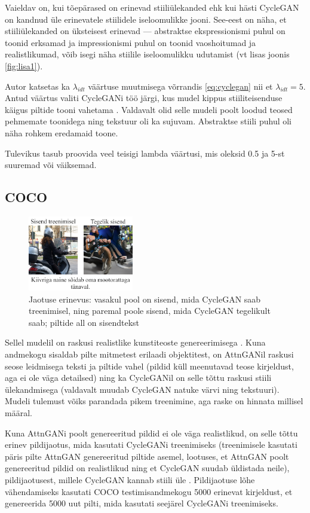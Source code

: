 \documentclass{vilgym}
\begin{document}
	Vaieldav on, kui tõepärased on erinevad stiiliülekanded ehk kui hästi CycleGAN on kandnud üle erinevatele stiilidele iseloomulikke jooni. See-eest on näha, et stiiliülekanded on üksteisest erinevad --- abstraktse ekspressionismi puhul on toonid erksamad ja impressionismi puhul on toonid vaoshoitumad ja realistlikumad, võib isegi näha stiilile iseloomulikku udutamist (vt lisas joonis \ref{fig:lisa1}).

	Autor katsetas ka $ \lambda_{idt} $ väärtuse muutmisega võrrandis \ref{eq:cyclegan} nii et $ \lambda_{idt} = 5 $. Antud väärtus valiti CycleGANi töö järgi, kus mudel kippus stiiliteisenduse käigus piltide tooni vahetama \parencite{cyclegan}. Valdavalt olid selle mudeli poolt loodud teosed pehmemate toonidega ning tekstuur oli ka sujuvam. Abstraktse stiili puhul oli näha rohkem eredamaid toone.

	Tulevikus tasub proovida veel teisigi lambda väärtusi, mis oleksid 0.5 ja 5-st suuremad või väiksemad. 

	\subsection{COCO}

	\begin{figure}
		\includegraphics[width=0.41\textwidth]{images/distribution.png}
		\caption{Jaotuse erinevus: vasakul pool on sisend, mida CycleGAN saab treenimisel, ning paremal poole sisend, mida CycleGAN tegelikult saab; piltide all on sisendtekst}
		\label{fig:dist}
	\end{figure}
	Sellel mudelil on raskusi realistlike kunstiteoste genereerimisega . Kuna andmekogu sisaldab pilte mitmetest erilaadi objektitest, on AttnGANil raskusi seose leidmisega teksti ja 
	piltide vahel (pildid küll meenutavad teose kirjeldust, aga ei ole väga detailsed) ning ka CycleGANil on selle tõttu raskusi stiili ülekandmisega (valdavalt muudab CycleGAN natuke värvi ning tekstuuri). Mudeli tulemust võiks parandada pikem treenimine, aga raske on hinnata millisel määral.


	Kuna AttnGANi poolt genereeritud pildid ei ole väga realistlikud, on selle tõttu erinev pildijaotus, mida kasutati \mbox{CycleGANi} treenimiseks (treenimisele kasutati päris pilte AttnGAN genereeritud piltide asemel, lootuses, et AttnGAN poolt genereeritud pildid on realistlikud ning et CycleGAN suudab üldistada neile), pildijaotusest, millele CycleGAN kannab stiili üle . Pildijaotuse lõhe vähendamiseks kasutati COCO testimisandmekogu 5000 erinevat kirjeldust, et genereerida 5000 uut pilti, mida kasutati seejärel CycleGANi treenimiseks.
\end{document}
